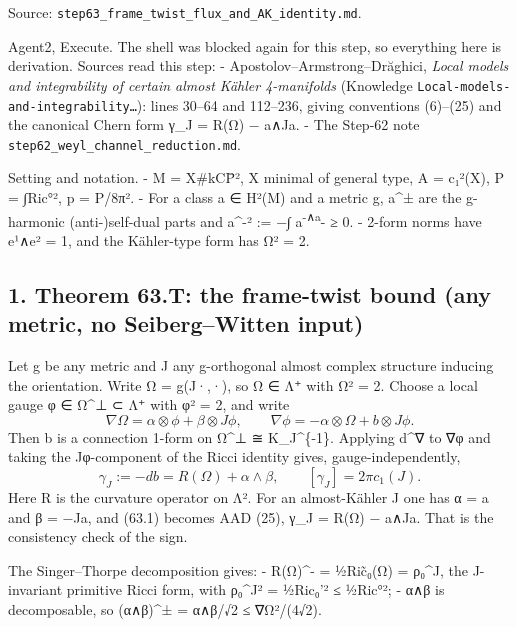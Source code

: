 \documentclass[
  10pt,
]{report}
\begin{document}
Source: \texttt{step63\_frame\_twist\_flux\_and\_AK\_identity.md}.

Agent2, Execute. The shell was blocked again for this step, so
everything here is derivation. Sources read this step: -
Apostolov--Armstrong--Drăghici, \emph{Local models and integrability of
certain almost Kähler 4-manifolds} (Knowledge
\texttt{Local-models-and-integrability\ldots{}}): lines 30--64 and
112--236, giving conventions (6)--(25) and the canonical Chern form γ\_J
= R(Ω) − a∧Ja. - The Step-62 note
\texttt{step62\_weyl\_channel\_reduction.md}.

Setting and notation. - M = X\#kCP̄², X minimal of general type, A =
c₁²(X), P = ∫\textbar Ric°\textbar², p = P/8π². - For a class a ∈ H²(M)
and a metric g, a\^{}± are the g-harmonic (anti-)self-dual parts and
\textbar a\^{}-\textbar² := −∫ a\textsuperscript{-∧a}- ≥ 0. - 2-form
norms have \textbar e¹∧e²\textbar{} = 1, and the Kähler-type form has
\textbar Ω\textbar² = 2.

\hypertarget{theorem-63.t-the-frame-twist-bound-any-metric-no-seibergwitten-input}{%
\subsection{1. Theorem 63.T: the frame-twist bound (any metric, no
Seiberg--Witten
input)}\label{theorem-63.t-the-frame-twist-bound-any-metric-no-seibergwitten-input}}

Let g be any metric and J any g-orthogonal almost complex structure
inducing the orientation. Write Ω = g(J·,·), so Ω ∈ Λ⁺ with
\textbar Ω\textbar² = 2. Choose a local gauge φ ∈ Ω\^{}⊥ ⊂ Λ⁺ with
\textbar φ\textbar² = 2, and write \[
\nabla\Omega=\alpha\otimes\phi+\beta\otimes J\phi,\qquad
\nabla\phi=-\alpha\otimes\Omega+b\otimes J\phi .
\] Then b is a connection 1-form on Ω\^{}⊥ ≅ K\_J\^{}\{-1\}. Applying
d\^{}∇ to ∇φ and taking the Jφ-component of the Ricci identity gives,
gauge-independently, \[
\gamma_J:=-db=R(\Omega)+\alpha\wedge\beta ,\qquad [\gamma_J]=2\pi c_1(J).
\tag{63.1}
\] Here R is the curvature operator on Λ². For an almost-Kähler J one
has α = a and β = −Ja, and (63.1) becomes AAD (25), γ\_J = R(Ω) − a∧Ja.
That is the consistency check of the sign.

The Singer--Thorpe decomposition gives: - R(Ω)\^{}- = ½Ric̃₀(Ω) =
ρ₀\^{}J, the J-invariant primitive Ricci form, with
\textbar ρ₀\^{}J\textbar² = ½\textbar Ric₀'\textbar² ≤
½\textbar Ric°\textbar²; - α∧β is decomposable, so
\textbar(α∧β)\^{}±\textbar{} = \textbar α∧β\textbar/√2 ≤
\textbar∇Ω\textbar²/(4√2).
\end{document}
